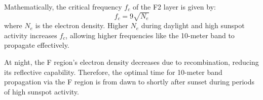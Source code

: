 Mathematically, the critical frequency \( f_c \) of the F2 layer is given by:
\[
f_c = 9 \sqrt{N_e}
\]
where \( N_e \) is the electron density. Higher \( N_e \) during daylight and high sunspot activity increases \( f_c \), allowing higher frequencies like the 10-meter band to propagate effectively. 

At night, the F region’s electron density decreases due to recombination, reducing its reflective capability. Therefore, the optimal time for 10-meter band propagation via the F region is from dawn to shortly after sunset during periods of high sunspot activity.

